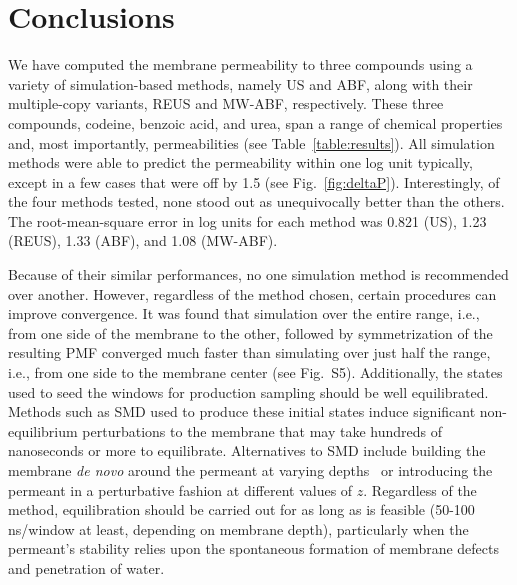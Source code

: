 %

\section*{Conclusions}

We have computed the membrane permeability to three compounds using a variety of simulation-based methods, namely US and ABF, along with their multiple-copy variants, REUS and MW-ABF, respectively.  These three compounds, codeine, benzoic acid, and urea, span a range of chemical properties and, most importantly, permeabilities (see Table~\ref{table:results}).  All simulation methods were able to predict the permeability within one log unit typically, except in a few cases that were off by 1.5 (see Fig.~\ref{fig:deltaP}).  Interestingly, of the four methods tested, none stood out as unequivocally better than the others.  The root-mean-square error in log units for each method was 0.821 (US), 1.23 (REUS), 1.33 (ABF), and 1.08 (MW-ABF). 

Because of their similar performances, no one simulation method is recommended over another.  However, regardless of the method chosen, certain procedures can improve convergence.   It was found that simulation over the entire range, i.e., from one side of the membrane to the other, followed by symmetrization of the resulting PMF converged much faster than simulating over just half the range, i.e., from one side to the membrane center (see Fig.~S5).  Additionally, the states used to seed the windows for production sampling should be well equilibrated.  Methods such as SMD used to produce these initial states induce significant non-equilibrium perturbations to the membrane that may take hundreds of nanoseconds or more to equilibrate.  Alternatives to SMD include building the membrane {\it de novo} around the permeant at varying depths~\cite{Dorairaj2007} or introducing the permeant in a perturbative fashion at different values of $z$.  Regardless of the method, equilibration should be carried out for as long as is feasible (50-100\,ns/window at least, depending on membrane depth), particularly when the permeant's stability relies upon the spontaneous formation of membrane defects and penetration of water.


